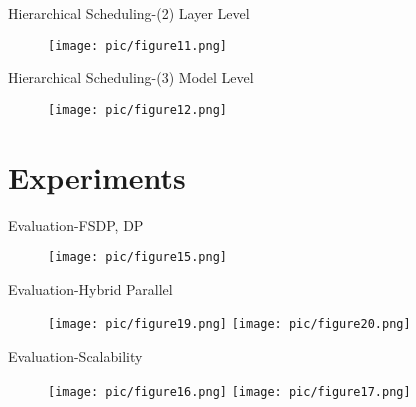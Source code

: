 \documentclass{beamer}
\begin{document}
\begin{frame}{Hierarchical Scheduling-(2) Layer Level}
	\begin{figure}
		\centering
		\texttt{[image: pic/figure11.png]}
		\label{secert_sharing_figures}
	\end{figure}
\end{frame}


\begin{frame}{Hierarchical Scheduling-(3) Model Level}
	\begin{figure}
		\centering
		\texttt{[image: pic/figure12.png]}
		\label{secert_sharing_figures}
	\end{figure}
\end{frame}
\section{Experiments}
\begin{frame}{Evaluation-FSDP, DP}
	\begin{figure}
		\centering
		\texttt{[image: pic/figure15.png]}
		\label{secert_sharing_figures}
	\end{figure}
\end{frame}

\begin{frame}{Evaluation-Hybrid Parallel}
	\begin{figure}
		\centering
		\texttt{[image: pic/figure19.png]}%
        \texttt{[image: pic/figure20.png]}
		\label{secert_sharing_figures}
	\end{figure}
\end{frame}

\begin{frame}{Evaluation-Scalability}
	\begin{figure}
		\centering
		\texttt{[image: pic/figure16.png]}%
        \texttt{[image: pic/figure17.png]}
		\label{secert_sharing_figures}
	\end{figure}
\end{frame}

\end{document}
